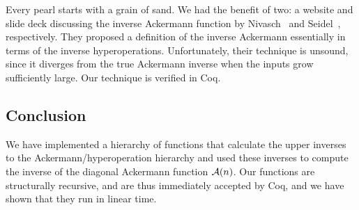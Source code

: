 Every pearl starts with a grain of sand.  We had the benefit of two: a website and slide deck 
discussing the inverse Ackermann function by Nivasch~\cite{nivasch} and Seidel~\cite{seidel},
respectively.  They proposed a definition of the inverse Ackermann essentially in terms of
the inverse hyperoperations.  Unfortunately, their technique is unsound, since it diverges from
the true Ackermann inverse when the inputs grow sufficiently large.  Our technique is verified in Coq.

\subsection{Conclusion}
We have implemented a hierarchy of functions that calculate the upper inverses
to the Ackermann/hyperoperation hierarchy and used these inverses
to compute the inverse of the diagonal Ackermann function $\mathcal{A}(n)$.
Our functions are structurally recursive, and are thus immediately accepted by Coq,
and we have shown that they run in linear time.







